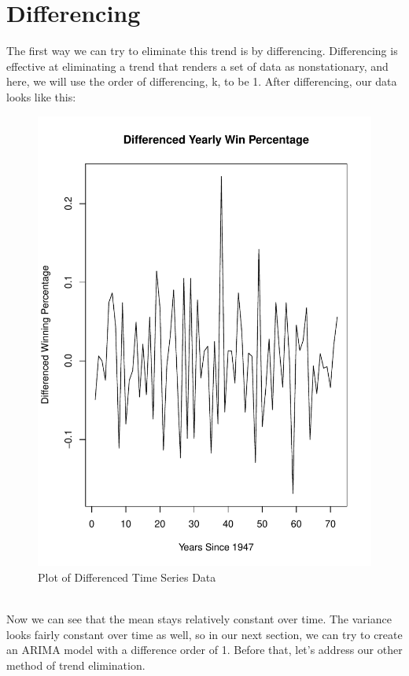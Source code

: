 \documentclass[12pt]{article}
\begin{document}
\section{Differencing}\label{sec:chapter}
The first way we can try to eliminate this trend is by differencing. Differencing is effective at eliminating a trend that renders a set of data as nonstationary, and here, we will use the order of differencing, k, to be 1. After differencing, our data looks like this:\\
\begin{figure}[h!]
\centering
\includegraphics[scale=0.6]{Differenced Win.pdf}
\caption{Plot of Differenced Time Series Data}
\label{fig:Figure 2}
\end{figure}\\
Now we can see that the mean stays relatively constant over time. The variance looks fairly constant over time as well, so in our next section, we can try to create an ARIMA model with a difference order of 1. Before that, let's address our other method of trend elimination.\\
\end{document}
